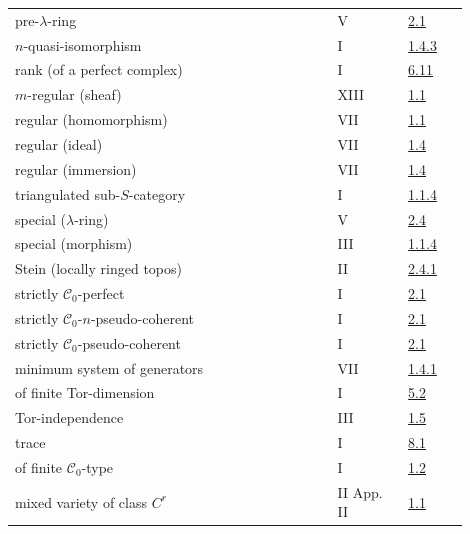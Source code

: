 \begin{longtable}{@{}>{\raggedright\arraybackslash}p{0.64\linewidth}>{\raggedright\arraybackslash}p{0.14\linewidth}>{\raggedright\arraybackslash}p{0.12\linewidth}@{}}
pre-\(\lambda\)-ring & V & \hyperlink{sga6.e05.def.2-1}{2.1}\\
\(n\)-quasi-isomorphism & I & \hyperlink{sga6.e01.def.1-4-3}{1.4.3}\\
rank (of a perfect complex) & I & \hyperlink{sga6.e01.def.6-11}{6.11}\\
\(m\)-regular (sheaf) & XIII & \hyperlink{sga6.e13.def.1-1}{1.1}\\
regular (homomorphism) & VII & \hyperlink{sga6.e07.def.1-1}{1.1}\\
regular (ideal) & VII & \hyperlink{sga6.e07.def.1-4}{1.4}\\
regular (immersion) & VII & \hyperlink{sga6.e07.def.1-4}{1.4}\\
triangulated sub-\(S\)-category & I & \hyperlink{sga6.e01.para.1-1-4}{1.1.4}\\
special (\(\lambda\)-ring) & V & \hyperlink{sga6.e05.def.2-4}{2.4}\\
special (morphism) & III & \hyperlink{sga6.e03.lem.1-1-4}{1.1.4}\\
Stein (locally ringed topos) & II & \hyperlink{sga6.e02.def.2-4-1}{2.4.1}\\
strictly \(\mathcal C_0\)-perfect & I & \hyperlink{sga6.e01.def.2-1}{2.1}\\
strictly \(\mathcal C_0\)-\(n\)-pseudo-coherent & I & \hyperlink{sga6.e01.def.2-1}{2.1}\\
strictly \(\mathcal C_0\)-pseudo-coherent & I & \hyperlink{sga6.e01.def.2-1}{2.1}\\
minimum system of generators & VII & \hyperlink{sga6.e07.def.1-4}{1.4.1}\\
of finite Tor-dimension & I & \hyperlink{sga6.e01.def.5-2}{5.2}\\
Tor-independence & III & \hyperlink{sga6.e03.def.1-5}{1.5}\\
trace & I & \hyperlink{sga6.e01.para.8-1}{8.1}\\
of finite \(\mathcal C_0\)-type & I & \hyperlink{sga6.e01.sec.1.2}{1.2}\\
mixed variety of class \(C^r\) & II App. II & \hyperlink{sga6.e02.sec.1.1}{1.1}\\
\bottomrule
\end{longtable}
\endgroup

